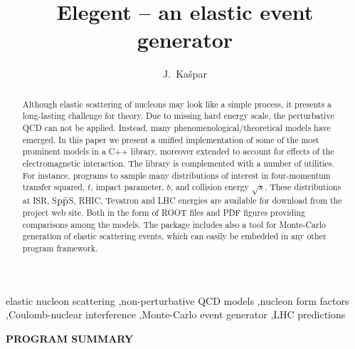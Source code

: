 \documentclass[preprint,12pt]{elsarticle}
\begin{document}
\begin{frontmatter}

\title{Elegent -- an elastic event generator}

\author{J.~Ka\v spar}
\address{CERN, 1211 Geneva 23, Switzerland}



\begin{abstract}
Although elastic scattering of nucleons may look like a simple process, it presents a long-lasting challenge for theory. Due to missing hard energy scale, the perturbative QCD can not be applied. Instead, many phenomenological/theoretical models have emerged. In this paper we present a unified implementation of some of the most prominent models in a C++ library, moreover extended to account for effects of the electromagnetic interaction. The library is complemented with a number of utilities. For instance, programs to sample many distributions of interest in four-momentum transfer squared, $t$, impact parameter, $b$, and collision energy $\sqrt s$. These distributions at ISR, S$\rm p\bar p$S, RHIC, Tevatron and LHC energies are available for download from the project web site. Both in the form of ROOT files and PDF figures providing comparisons among the models. The package includes also a tool for Monte-Carlo generation of elastic scattering events, which can easily be embedded in any other program framework.
\end{abstract}

\begin{keyword}
elastic nucleon scattering \sep non-perturbative QCD models \sep nucleon form factors \sep Coulomb-nuclear interference \sep Monte-Carlo event generator \sep LHC predictions

\end{keyword}

\end{frontmatter}



\iffalse

\noindent
{\bf PROGRAM SUMMARY}
\end{document}

